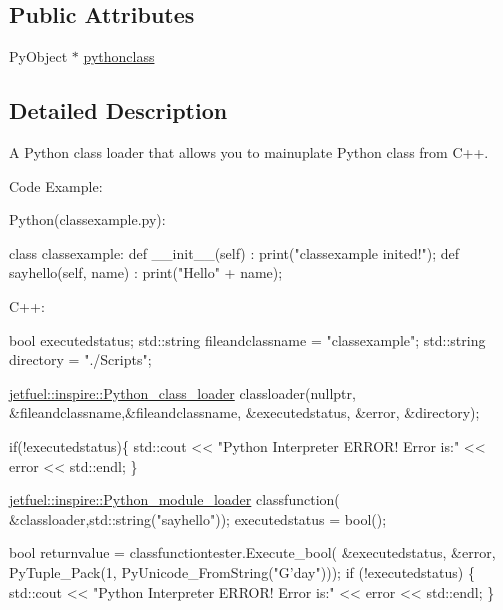 \subsection*{Public Attributes}
\begin{DoxyCompactItemize}
\item 
Py\+Object $\ast$ \hyperlink{classjetfuel_1_1inspire_1_1Python__class__loader_adbcf46681199db320a6b09aec18a2ca8}{pythonclass}
\end{DoxyCompactItemize}


\subsection{Detailed Description}
A Python class loader that allows you to mainuplate Python class from C++.

Code Example\+:

Python(classexample.\+py)\+:


\begin{DoxyCode}
\textcolor{keyword}{class }classexample:
    def \_\_init\_\_(self) :
        print("classexample inited!");
    def sayhello(self, name) :
        print("Hello" + name);
\end{DoxyCode}


C++\+: 
\begin{DoxyCode}
\textcolor{keywordtype}{bool} executedstatus;
std::string fileandclassname = \textcolor{stringliteral}{"classexample"};
std::string directory = \textcolor{stringliteral}{"./Scripts"};    


\hyperlink{classjetfuel_1_1inspire_1_1Python__class__loader}{jetfuel::inspire::Python\_class\_loader} classloader(\textcolor{keyword}{nullptr}, 
                        &fileandclassname,&fileandclassname,
                        &executedstatus, &error, &directory);

\textcolor{keywordflow}{if}(!executedstatus)\{
    std::cout << \textcolor{stringliteral}{"Python Interpreter ERROR! Error is:"} << error
    << std::endl;
\}

\hyperlink{classjetfuel_1_1inspire_1_1Python__module__loader}{jetfuel::inspire::Python\_module\_loader} classfunction(
                        &classloader,std::string(\textcolor{stringliteral}{"sayhello"}));
executedstatus = bool();

\textcolor{keywordtype}{bool} returnvalue = classfunctiontester.Execute\_bool(
                                    &executedstatus, &error, 
                PyTuple\_Pack(1, PyUnicode\_FromString(\textcolor{stringliteral}{"G'day"})));
\textcolor{keywordflow}{if} (!executedstatus) \{
    std::cout << \textcolor{stringliteral}{"Python Interpreter ERROR! Error is:"} << 
    error << std::endl;
\}
\end{DoxyCode}
 

